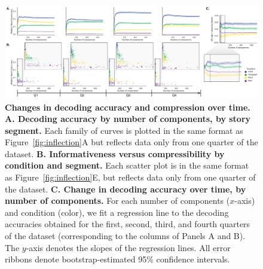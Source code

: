 \documentclass[english, 11pt]{article}
\begin{document}
\begin{figure}[tp]
  \centering
  \includegraphics[width=\textwidth]{figs/information_and_compression_over_time}

\caption{\textbf{Changes in decoding accuracy and compression over time.}
\textbf{A. Decoding accuracy by number of components, by story segment.} Each
family of curves is plotted in the same format as Figure~\ref{fig:inflection}A
but reflects data only from one quarter of the dataset. \textbf{B.
Informativeness versus compressibility by condition and segment.} Each scatter
plot is in the same format as Figure~\ref{fig:inflection}E, but reflects data
only from one quarter of the dataset. \textbf{C. Change in decoding accuracy
over time, by number of components.} For each number of components ($x$-axis)
and condition (color), we fit a regression line to the decoding accuracies
obtained for the first, second, third, and fourth quarters of the dataset
(corresponding to the columns of Panels A and B). The $y$-axis denotes the
slopes of the regression lines. All error ribbons denote bootstrap-estimated
95\% confidence intervals.}

\label{fig:inflection-quarters}

\end{figure}
\end{document}
